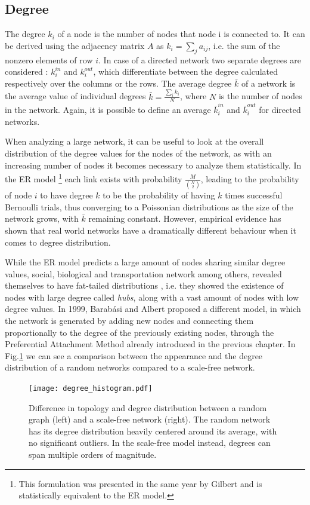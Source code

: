 \subsection{Degree}
The degree $k_{i}$ of a node is the number of nodes that node i is connected to. 
It can be derived using the adjacency matrix $A$ as  $k_{i} = \sum_{j} a_{ij} $, i.e. the sum of the nonzero elements of
row $i$. In case of a directed network two separate degrees are considered : $k^{in}_{i}$ and $k_{i}^{out}$, which differentiate
between the degree calculated respectively over the columns or the rows. The average degree  $\bar{k}$  of a network is the average value of individual degrees 
  $\bar{k} = \frac{\sum_{i} k_{i}}{N} $, where $N$ is the number of nodes in the network. Again, it is possible to define an average $\bar{k}^{in}_{i}$ and $\bar{k}_{i}^{out}$ for directed networks.
  
When analyzing a large network, it can be useful to look at the overall distribution of the degree values for the nodes of the network, as with an increasing number of nodes it 
becomes necessary to analyze them statistically. In the ER model \footnote{This formulation was presented in the same year by Gilbert \cite{gilbert1959} and is statistically equivalent
to the ER model.} each link exists with probability $\frac{M}{\binom{N}{2}}$, leading to the probability of node $i$ to have degree $k$ to be the 
probability of having $k$ times successful
Bernoulli trials, thus converging to a Poissonian distributions as the size of the network grows, with $\bar{k}$ remaining constant.
However, empirical evidence \cite{Barabasi2004degree}
has shown that real world networks have a dramatically different behaviour when it comes to degree distribution.

While the ER model predicts a large amount of nodes sharing
similar degree values, social, biological and transportation network among others, revealed themselves to have fat-tailed distributions \cite{Clauset2009}, i.e. they showed the existence of nodes with large degree called \textit{hubs}, along with a 
vast amount of nodes with low degree values. In 1999, Barab{\'a}si and Albert proposed a different model, in which the network is generated by adding new nodes and
connecting
them proportionally to the degree of the previously existing nodes, through the Preferential Attachment Method already introduced in the previous chapter. In Fig.\ref{fig:degree} we can see a comparison
between the appearance and the degree distribution of a random networks compared to a scale-free network. 
 \begin{figure}[h]
\centering
\texttt{[image: degree\_histogram.pdf]}%
\caption{Difference in topology and degree distribution between a random graph (left) and a scale-free network (right). The random network has its degree distribution heavily
centered around its average, with no significant outliers. In the scale-free model instead, degrees can span multiple orders of magnitude.}
\label{fig:degree}
\end{figure}
   
